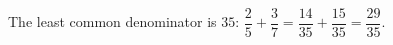 The least common denominator is $35$: $\dfrac25+\dfrac37=\dfrac{14}{35}+\dfrac{15}{35}=\boxed{\dfrac{29}{35}}$.
